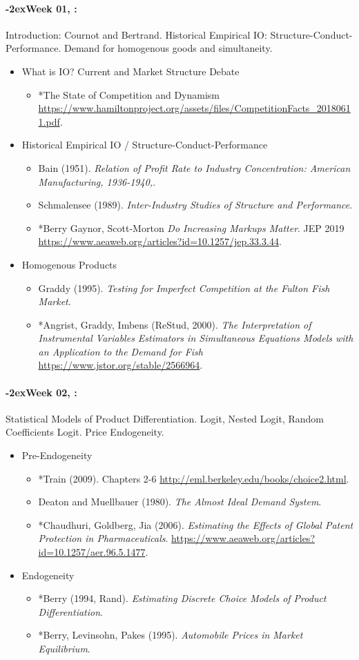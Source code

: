 \documentclass[11pt]{article}
\newcommand{\week}[1]{%
  \paragraph*{\kern-2ex\quad #1, \syldate{\today}:}%
  \ifdim\wd1=\wd\THURSDAY
    \AdvanceDate[7]
  \else
    \AdvanceDate[7]
  \fi%
}
\begin{document}
\SetDate[26/08/2016]
\week{Week 01} Introduction: Cournot and Bertrand. Historical Empirical IO: Structure-Conduct-Performance. Demand for homogenous goods and simultaneity.
\begin{itemize}
\item What is IO? Current and Market Structure Debate
\begin{itemize}
\item *The State of Competition and Dynamism \url{https://www.hamiltonproject.org/assets/files/CompetitionFacts_20180611.pdf}.
\end{itemize}

\item Historical Empirical IO / Structure-Conduct-Performance
\begin{itemize}
\item Bain (1951). \textit{Relation of Profit Rate to Industry Concentration: American Manufacturing, 1936-1940,}.
\item Schmalensee (1989). \textit{Inter-Industry Studies of Structure and Performance}.
\item *Berry Gaynor, Scott-Morton \textit{Do Increasing Markups Matter}. JEP 2019 \url{https://www.aeaweb.org/articles?id=10.1257/jep.33.3.44}.
\end{itemize}
\item Homogenous Products
\begin{itemize}
\item Graddy (1995). \textit{Testing for Imperfect Competition at the Fulton Fish Market}.
\item *Angrist, Graddy, Imbens (ReStud, 2000). \textit{The Interpretation of Instrumental Variables Estimators in Simultaneous Equations Models with an Application to the Demand for Fish} \url{https://www.jstor.org/stable/2566964}.
\end{itemize}
\end{itemize}

\week{Week 02} Statistical Models of Product Differentiation. Logit, Nested Logit, Random Coefficients Logit. Price Endogeneity.
\begin{itemize}
\item Pre-Endogeneity
\begin{itemize}
\item *Train (2009). Chapters 2-6 \url{http://eml.berkeley.edu/books/choice2.html}.
\item Deaton and Muellbauer (1980). \textit{The Almost Ideal Demand System}.
\item *Chaudhuri, Goldberg, Jia (2006). \textit{Estimating the Effects of Global Patent Protection in Pharmaceuticals}. \url{https://www.aeaweb.org/articles?id=10.1257/aer.96.5.1477}.
\end{itemize}
\item Endogeneity
\begin{itemize}
\item *Berry (1994, Rand). \textit{Estimating Discrete Choice Models of Product Differentiation}. 
\item *Berry, Levinsohn, Pakes (1995). \textit{Automobile Prices in Market Equilibrium}.
\end{itemize}
\end{itemize}
\end{document}

